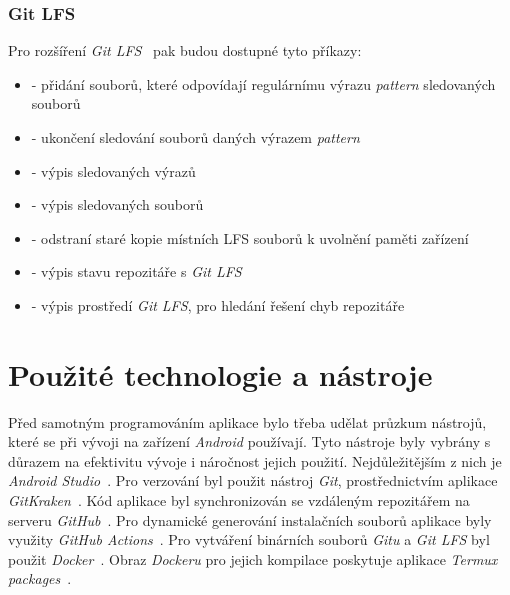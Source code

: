         \subsubsection{Git LFS}
        Pro rozšíření \emph{Git LFS}~ pak budou dostupné tyto příkazy:
        \begin{itemize}
            \item \textbf{} - přidání souborů, které odpovídají regulárnímu výrazu \emph{pattern} sledovaných souborů
            \item \textbf{} - ukončení sledování souborů daných výrazem \emph{pattern}
            \item \textbf{} - výpis sledovaných výrazů
            \item \textbf{} - výpis sledovaných souborů
            \item \textbf{} - odstraní staré kopie místních LFS souborů k uvolnění paměti zařízení
            \item \textbf{} - výpis stavu repozitáře s \emph{Git LFS}
            \item \textbf{} - výpis prostředí \emph{Git LFS}, pro hledání řešení chyb repozitáře
        \end{itemize}
    
\section{Použité technologie a nástroje}
Před samotným programováním aplikace bylo třeba udělat průzkum nástrojů, které se při vývoji na zařízení \emph{Android} používají. Tyto nástroje byly vybrány s důrazem na efektivitu vývoje i náročnost jejich použití. Nejdůležitějším z nich je \emph{Android Studio}~. Pro verzování byl použit nástroj \emph{Git}, prostřednictvím aplikace \emph{GitKraken}~. Kód aplikace byl synchronizován se vzdáleným repozitářem na serveru \emph{GitHub}~. Pro dynamické generování instalačních souborů aplikace byly využity \emph{GitHub Actions}~. Pro vytváření binárních souborů \emph{Gitu} a \emph{Git LFS} byl použit \emph{Docker}~. Obraz \emph{Dockeru} pro jejich kompilace poskytuje aplikace \emph{Termux packages}~\label{termux_packages}.

